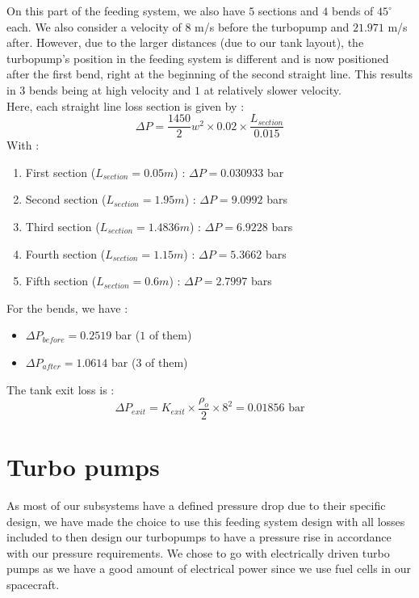 On this part of the feeding system, we also have $5$ sections and $4$ bends of $45^\circ$ each. We also consider a velocity of $8$ m/s before the turbopump and $21.971$ m/s after. However, due to the larger distances (due to our tank layout), the turbopump's position in the feeding system is different and is now positioned after the first bend, right at the beginning of the second straight line. This results in $3$ bends being at high velocity and $1$ at relatively slower velocity.\\

Here, each straight line loss section is given by : 
$$
\Delta P = \frac {1450} 2 w^2 \times 0.02 \times \frac{L_{section}}{0.015}
$$
With : 

\begin{enumerate}
	\item First section ($L_{section}=0.05m$) : $\Delta P = 0.030933$ bar
	\item Second section ($L_{section}=1.95m$) : $\Delta P = 9.0992$ bars
	\item Third section ($L_{section}=1.4836m$) : $\Delta P = 6.9228$ bars
	\item Fourth section ($L_{section}=1.15m$) : $\Delta P = 5.3662$ bars
	\item Fifth section ($L_{section}=0.6m$) : $\Delta P = 2.7997$ bars
\end{enumerate}

For the bends, we have :

\begin{itemize}
	\item $\Delta P_{before} = 0.2519 $ bar ($1$ of them)
	\item $\Delta P_{after} = 1.0614$ bar ($3$ of them)
\end{itemize}

The tank exit loss is :
$$
\Delta P_{exit} = K_{exit} \times \frac{\rho_o}2 \times 8 ^ 2 = 0.01856\text{ bar}
$$
\section{Turbo pumps}
As most of our subsystems have a defined pressure drop due to their specific design, we have made the choice to use this feeding system design with all losses included to then design our turbopumps to have a pressure rise in accordance with our pressure requirements. We chose to go with electrically driven turbo pumps as we have a good amount of electrical power since we use fuel cells in our spacecraft.\\

